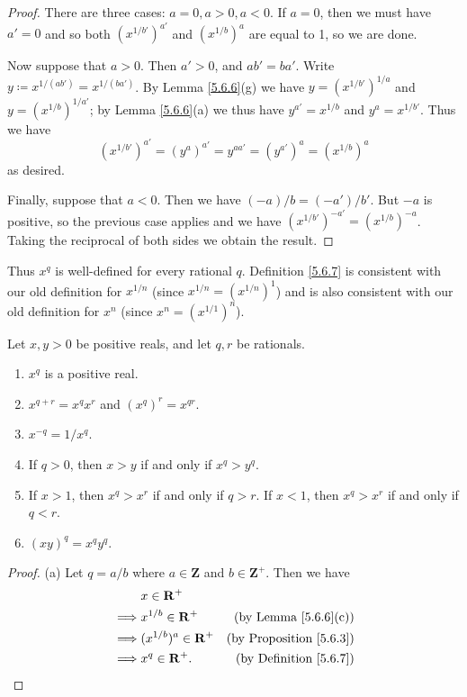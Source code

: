 \begin{proof}
    There are three cases: \(a = 0, a > 0, a < 0\).
    If \(a = 0\), then we must have \(a' = 0\) and so both \((x^{1 / b'})^{a'}\) and \((x^{1 / b})^a\) are equal to 1, so we are done.

    Now suppose that \(a > 0\).
    Then \(a' > 0\), and \(ab' = ba'\).
    Write \(y \coloneqq x^{1 / (ab')} = x^{1 / (ba')}\).
    By Lemma \ref{5.6.6}(g) we have \(y = (x^{1 / b'})^{1 / a}\) and \(y = (x^{1 / b})^{1 / a'}\);
    by Lemma \ref{5.6.6}(a) we thus have \(y^{a'} = x^{1 / b}\) and \(y^a = x^{1 / b'}\).
    Thus we have
    \[
        (x^{1 / b'})^{a'} = (y^a)^{a'} = y^{aa'} = (y^{a'})^a = (x^{1 / b})^a
    \]
    as desired.

    Finally, suppose that \(a < 0\).
    Then we have \((-a) / b = (-a') / b'\).
    But \(-a\) is positive, so the previous case applies and we have \((x^{1 / b'})^{-a'} = (x^{1 / b})^{-a}\).
    Taking the reciprocal of both sides we obtain the result.
\end{proof}

\begin{note}
    Thus \(x^q\) is well-defined for every rational \(q\).
    Definition \ref{5.6.7} is consistent with our old definition for \(x^{1 / n}\) (since \(x^{1 / n} = (x^{1 / n})^1\)) and is also consistent with our old definition for \(x^n\) (since \(x^n = (x^{1 / 1})^n\)).
\end{note}

\begin{lemma}\label{5.6.9}
    Let \(x, y > 0\) be positive reals, and let \(q, r\) be rationals.
    \begin{enumerate}
        \item \(x^q\) is a positive real.
        \item \(x^{q + r} = x^q x^r\) and \((x^q)^r = x^{qr}\).
        \item \(x^{-q} = 1 / x^q\).
        \item If \(q > 0\), then \(x > y\) if and only if \(x^q > y^q\).
        \item If \(x > 1\), then \(x^q > x^r\) if and only if \(q > r\).
              If \(x < 1\), then \(x^q > x^r\) if and only if \(q < r\).
        \item \((xy)^q = x^q y^q\).
    \end{enumerate}
\end{lemma}

\begin{proof}{(a)}
    Let \(q = a / b\) where \(a \in \mathbf{Z}\) and \(b \in \mathbf{Z}^+\).
    Then we have
    \begin{align*}
                 & x \in \mathbf{R}^+                                                   \\
        \implies & x^{1 / b} \in \mathbf{R}^+     & \text{(by Lemma \ref{5.6.6}(c))}    \\
        \implies & (x^{1 / b})^a \in \mathbf{R}^+ & \text{(by Proposition \ref{5.6.3})} \\
        \implies & x^q \in \mathbf{R}^+.          & \text{(by Definition \ref{5.6.7})}
    \end{align*}
\end{proof}

